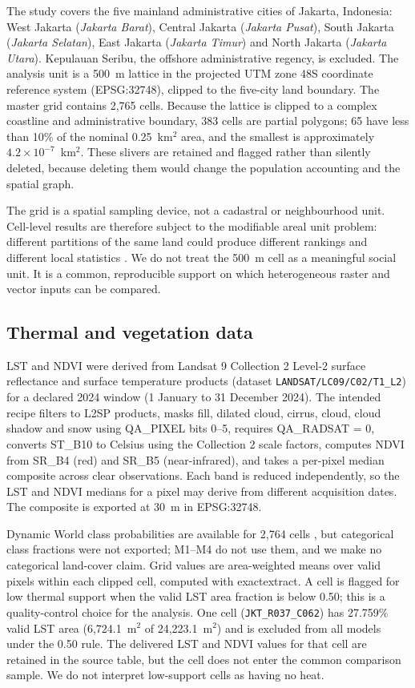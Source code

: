 \documentclass[times,twoside]{_Templates/MultiTargetManuscript}
\begin{document}
The study covers the five mainland administrative cities of Jakarta, Indonesia:
West Jakarta (\textit{Jakarta Barat}), Central Jakarta (\textit{Jakarta Pusat}),
South Jakarta (\textit{Jakarta Selatan}), East Jakarta (\textit{Jakarta Timur})
and North Jakarta (\textit{Jakarta Utara}). Kepulauan Seribu, the offshore
administrative regency, is excluded. The analysis unit is a 500~m lattice in the
projected UTM zone 48S coordinate reference system (EPSG:32748), clipped to the
five-city land boundary. The master grid contains 2,765 cells. Because the
lattice is clipped to a complex coastline and administrative boundary, 383 cells
are partial polygons; 65 have less than 10\% of the nominal 0.25~km$^2$ area, and
the smallest is approximately $4.2\times10^{-7}$~km$^2$. These slivers are
retained and flagged rather than silently deleted, because deleting them would
change the population accounting and the spatial graph.

The grid is a spatial sampling device, not a cadastral or neighbourhood unit.
Cell-level results are therefore subject to the modifiable areal unit problem:
different partitions of the same land could produce different rankings and
different local statistics \citep{openshaw1984}. We do not treat the 500~m cell
as a meaningful social unit. It is a common, reproducible support on which
heterogeneous raster and vector inputs can be compared.

\subsection{Thermal and vegetation data}

LST and NDVI were derived from Landsat 9 Collection 2 Level-2 surface
reflectance and surface temperature products (dataset
\texttt{LANDSAT/LC09/C02/T1\_L2}) \citep{usgs2020} for a declared 2024 window
(1 January to 31 December 2024). The intended recipe filters to L2SP products, masks fill,
dilated cloud, cirrus, cloud, cloud shadow and snow using QA\_PIXEL bits 0--5,
requires QA\_RADSAT = 0, converts ST\_B10 to Celsius using the Collection 2
scale factors, computes NDVI from SR\_B4 (red) and SR\_B5 (near-infrared), and
takes a per-pixel median composite across clear observations. Each band is
reduced independently, so the LST and NDVI medians for a pixel may derive from
different acquisition dates. The composite is exported at 30~m in EPSG:32748.

Dynamic World class probabilities are available for 2,764 cells
\citep{brown2022}, but categorical class fractions were not exported; M1--M4 do
not use them, and we make no categorical land-cover claim.
Grid values are area-weighted means over valid pixels within each clipped cell,
computed with exactextract. A cell is flagged for low thermal support when the
valid LST area fraction is below 0.50; this is a quality-control choice for the
analysis. One cell
(\texttt{JKT\_R037\_C062}) has 27.759\% valid LST area (6,724.1~m$^2$ of
24,223.1~m$^2$) and is excluded from all models under the 0.50 rule. The
delivered LST and NDVI values for that cell are retained in the source table, but
the cell does not enter the common comparison sample. We do not interpret
low-support cells as having no heat.
\end{document}
